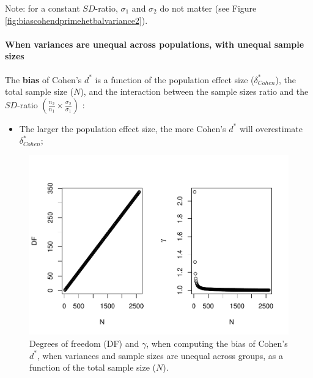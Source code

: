 \documentclass[
  english,
  man,mask]{apa6}
\providecommand{\tightlist}{%
  \setlength{\itemsep}{0pt}\setlength{\parskip}{0pt}}
\let\oldparagraph\paragraph
\renewcommand{\paragraph}[1]{\oldparagraph{#1}\mbox{}}
\begin{document}
Note: for a constant \(SD\)-ratio, \(\sigma_1\) and \(\sigma_2\) do not matter (see Figure \ref{fig:biascohendprimehetbalvariance2}).

\hypertarget{when-variances-are-unequal-across-populations-with-unequal-sample-sizes}{%
\paragraph{When variances are unequal across populations, with unequal sample sizes}\label{when-variances-are-unequal-across-populations-with-unequal-sample-sizes}}

The \textbf{bias} of Cohen's \(d^*\) is a function of the population effect size (\(\delta^*_{Cohen}\)), the total sample size (\(N\)), and the interaction between the sample sizes ratio and the \(SD\)-ratio \(\left(\frac{n_2}{n_1}\times\frac{\sigma_2}{\sigma_1} \right)\) :

\begin{itemize}
\tightlist
\item
  The larger the population effect size, the more Cohen's \(d^*\) will overestimate \(\delta^*_{Cohen}\);
\end{itemize}

\begin{figure}
\centering
\includegraphics{SupMat1_files/figure-latex/biascohendprimehetunbalNsize2-1.pdf}
\caption{\label{fig:biascohendprimehetunbalNsize2}Degrees of freedom (DF) and \(\gamma\), when computing the bias of Cohen's \(d^*\), when variances and sample sizes are unequal across groups, as a function of the total sample size (\(N\)).}
\end{figure}
\end{document}
